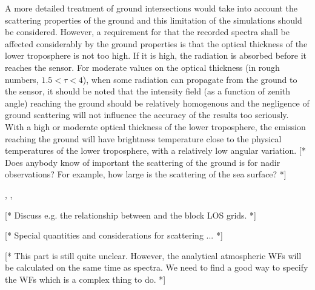 A more detailed treatment of ground intersections would take into
account the scattering properties of the ground and this limitation of
the simulations should be considered. However, a requirement for that
the recorded spectra shall be affected considerably by the ground
properties is that the optical thickness of the lower troposphere is
not too high. If it is high, the radiation is absorbed before it
reaches the sensor. For moderate values on the optical thickness (in
rough numbers, $1.5<\tau<4$), when some radiation can propagate
from the ground to the sensor, it should be noted that the intensity
field (as a function of zenith angle) reaching the ground should be
relatively homogenous and the negligence of ground scattering will not
influence the accuracy of the results too seriously. With a high or
moderate optical thickness of the lower troposphere, the emission
reaching the ground will have brightness temperature close to the
physical temperatures of the lower troposphere, with a relatively low
angular variation. [* Does anybody know of important the scattering of
the ground is for nadir observations? For example, how large is the
scattering of the sea surface? *]



\label{sec:fm_defs:sensor2}

, , 


\label{sec:fm_defs:howtomeasseq}

[* Discuss e.g. the relationship between  and the block LOS grids. *]


\label{sec:fm_defs:scattering}

[* Special quantities and considerations for scattering ... *]



\label{sec:fm_defs:wfs}

[* This part is still quite unclear. However, the analytical
atmospheric WFs will be calculated on the same time as spectra. We
need to find a good way to specify the WFs which is a complex thing to
do. *]


